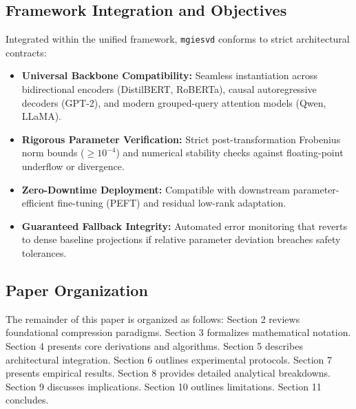 \subsection{Framework Integration and Objectives}
Integrated within the unified framework, \texttt{mgiesvd} conforms to strict architectural contracts:
\begin{itemize}
\item \textbf{Universal Backbone Compatibility:} Seamless instantiation across bidirectional encoders (DistilBERT, RoBERTa), causal autoregressive decoders (GPT-2), and modern grouped-query attention models (Qwen, LLaMA).
\item \textbf{Rigorous Parameter Verification:} Strict post-transformation Frobenius norm bounds ($\ge 10^{-4}$) and numerical stability checks against floating-point underflow or divergence.
\item \textbf{Zero-Downtime Deployment:} Compatible with downstream parameter-efficient fine-tuning (PEFT) and residual low-rank adaptation.
\item \textbf{Guaranteed Fallback Integrity:} Automated error monitoring that reverts to dense baseline projections if relative parameter deviation breaches safety tolerances.
\end{itemize}

\subsection{Paper Organization}
The remainder of this paper is organized as follows: Section 2 reviews foundational compression paradigms. Section 3 formalizes mathematical notation. Section 4 presents core derivations and algorithms. Section 5 describes architectural integration. Section 6 outlines experimental protocols. Section 7 presents empirical results. Section 8 provides detailed analytical breakdowns. Section 9 discusses implications. Section 10 outlines limitations. Section 11 concludes.
